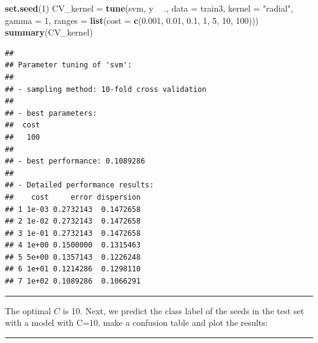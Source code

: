 \documentclass[]{article}
\newenvironment{Shaded}{\begin{snugshade}}{\end{snugshade}}
\newcommand{\DataTypeTok}[1]{\textcolor[rgb]{0.13,0.29,0.53}{#1}}
\newcommand{\DecValTok}[1]{\textcolor[rgb]{0.00,0.00,0.81}{#1}}
\newcommand{\FloatTok}[1]{\textcolor[rgb]{0.00,0.00,0.81}{#1}}
\newcommand{\KeywordTok}[1]{\textcolor[rgb]{0.13,0.29,0.53}{\textbf{#1}}}
\newcommand{\NormalTok}[1]{#1}
\newcommand{\OperatorTok}[1]{\textcolor[rgb]{0.81,0.36,0.00}{\textbf{#1}}}
\newcommand{\StringTok}[1]{\textcolor[rgb]{0.31,0.60,0.02}{#1}}
\begin{document}
\begin{Shaded}
\begin{Highlighting}[]
\KeywordTok{set.seed}\NormalTok{(}\DecValTok{1}\NormalTok{)}
\NormalTok{CV_kernel =}\StringTok{ }\KeywordTok{tune}\NormalTok{(svm, y }\OperatorTok{~}\StringTok{ }\NormalTok{., }\DataTypeTok{data =}\NormalTok{ train3, }\DataTypeTok{kernel =} \StringTok{"radial"}\NormalTok{, }\DataTypeTok{gamma =} \DecValTok{1}\NormalTok{, }
    \DataTypeTok{ranges =} \KeywordTok{list}\NormalTok{(}\DataTypeTok{cost =} \KeywordTok{c}\NormalTok{(}\FloatTok{0.001}\NormalTok{, }\FloatTok{0.01}\NormalTok{, }\FloatTok{0.1}\NormalTok{, }\DecValTok{1}\NormalTok{, }\DecValTok{5}\NormalTok{, }\DecValTok{10}\NormalTok{, }\DecValTok{100}\NormalTok{)))}
\KeywordTok{summary}\NormalTok{(CV_kernel)}
\end{Highlighting}
\end{Shaded}

\begin{verbatim}
## 
## Parameter tuning of 'svm':
## 
## - sampling method: 10-fold cross validation 
## 
## - best parameters:
##  cost
##   100
## 
## - best performance: 0.1089286 
## 
## - Detailed performance results:
##    cost     error dispersion
## 1 1e-03 0.2732143  0.1472658
## 2 1e-02 0.2732143  0.1472658
## 3 1e-01 0.2732143  0.1472658
## 4 1e+00 0.1500000  0.1315463
## 5 5e+00 0.1357143  0.1226248
## 6 1e+01 0.1214286  0.1298110
## 7 1e+02 0.1089286  0.1066291
\end{verbatim}

\normalsize

\begin{center}\rule{0.5\linewidth}{\linethickness}\end{center}

The optimal \(C\) is 10. Next, we predict the class label of the seeds
in the test set with a model with C=10, make a confusion table and plot
the results:

\begin{Shaded}
\end{Shaded}

\begin{center}\rule{0.5\linewidth}{\linethickness}\end{center}
\end{document}
